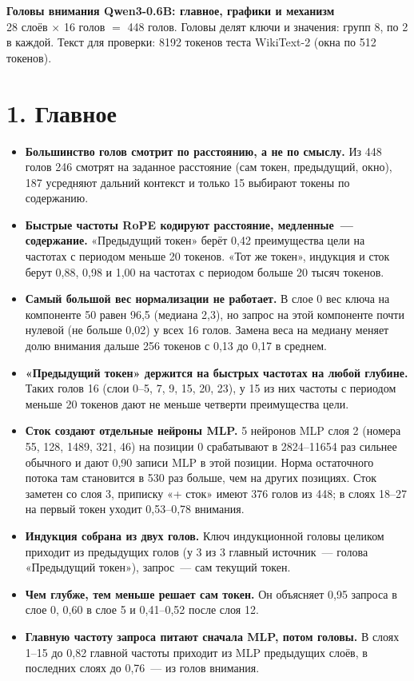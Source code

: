 \documentclass[10pt]{article}
\begin{document}
{\LARGE\bfseries Головы внимания Qwen3-0.6B: главное, графики и механизм}\\[0.2em]
{\color{ink2} 28 слоёв $\times$ 16 голов $=$ 448 голов. Головы делят ключи и значения: групп 8, по 2 в каждой. Текст для проверки: 8192 токенов теста WikiText-2 (окна по 512 токенов).}

\section*{1. Главное}
\begin{itemize}
\item \textbf{Большинство голов смотрит по расстоянию, а не по смыслу.} Из 448 голов 246 смотрят на заданное расстояние (сам токен, предыдущий, окно), 187 усредняют дальний контекст и только 15 выбирают токены по содержанию.
\item \textbf{Быстрые частоты RoPE кодируют расстояние, медленные~— содержание.} «Предыдущий токен» берёт 0,42 преимущества цели на частотах с периодом меньше 20 токенов. «Тот же токен», индукция и сток берут 0,88, 0,98 и 1,00 на частотах с периодом больше 20 тысяч токенов.
\item \textbf{Самый большой вес нормализации не работает.} В слое 0 вес ключа на компоненте 50 равен 96,5 (медиана 2,3), но запрос на этой компоненте почти нулевой (не больше 0,02) у всех 16 голов. Замена веса на медиану меняет долю внимания дальше 256 токенов с 0,13 до 0,17 в среднем.
\item \textbf{«Предыдущий токен» держится на быстрых частотах на любой глубине.} Таких голов 16 (слои \mbox{0–5}, 7, 9, 15, 20, 23), у 15 из них частоты с периодом меньше 20 токенов дают не меньше четверти преимущества цели.
\item \textbf{Сток создают отдельные нейроны MLP.} 5 нейронов MLP слоя 2 (номера 55, 128, 1489, 321, 46) на позиции 0 срабатывают в 2824–11654 раз сильнее обычного и дают 0,90 записи MLP в этой позиции. Норма остаточного потока там становится в 530 раз больше, чем на других позициях. Сток заметен со слоя 3, приписку «+ сток» имеют 376 голов из 448; в слоях 18–27 на первый токен уходит 0,53–0,78 внимания.
\item \textbf{Индукция собрана из двух голов.} Ключ индукционной головы целиком приходит из предыдущих голов (у 3 из 3 главный источник~— голова «Предыдущий токен»), запрос~— сам текущий токен.
\item \textbf{Чем глубже, тем меньше решает сам токен.} Он объясняет 0,95 запроса в слое 0, 0,60 в слое 5 и 0,41–0,52 после слоя 12.
\item \textbf{Главную частоту запроса питают сначала MLP, потом головы.} В слоях 1–15 до 0,82 главной частоты приходит из MLP предыдущих слоёв, в последних слоях до 0,76~— из голов внимания.
\end{itemize}
\end{document}
